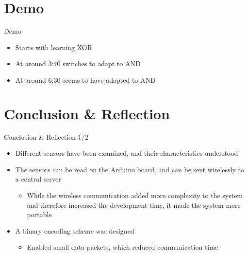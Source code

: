 \section{Demo}
\begin{frame}{Demo}
	\begin{itemize}
		\item Starts with learning XOR
		\item At around 3:40 switches to adapt to AND
		\item At around 6:30 seems to have adapted to AND
	\end{itemize}
\end{frame}

\section{Conclusion \& Reflection}
\begin{frame}{Conclusion \& Reflection 1/2}
	\begin{itemize}
    \item Different sensors have been examined, and their characteristics understood
    \item The sensors can be read on the Arduino board, and can be sent wirelessly to a central server
      \begin{itemize}
        \item While the wireless communication added more complexity to the system and therefore increased the development time, it made the system more portable
      \end{itemize}
    \item A binary encoding scheme was designed
      \begin{itemize}
        \item Enabled small data packets, which reduced communication time
      \end{itemize}
  \end{itemize}
\end{frame}

